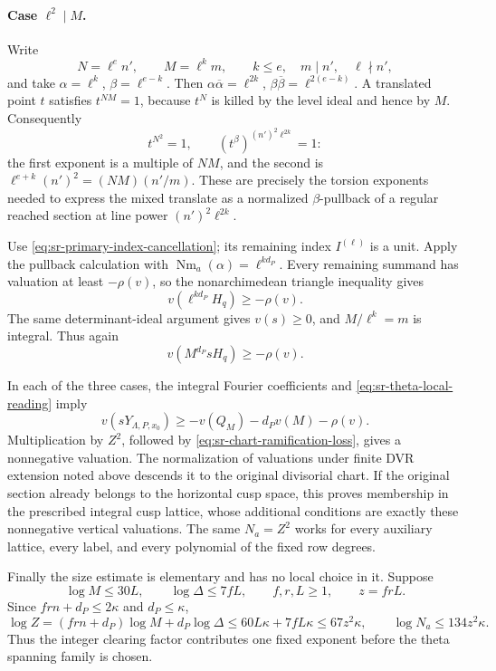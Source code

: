 \paragraph{Case \(\ell^2\mid M\).}
Write
\[
 N=\ell^e n',\qquad M=\ell^k m,\qquad
 k\le e,\quad m\mid n',\quad \ell\nmid n',
\]
and take \(\alpha=\ell^k\), \(\beta=\ell^{e-k}\).
Then
\(\alpha\overline\alpha=\ell^{2k}\),
\(\beta\overline\beta=\ell^{2(e-k)}\).
A translated point \(t\) satisfies \(t^{NM}=1\), because
\(t^N\) is killed by the level ideal and hence by \(M\).
Consequently
\[
 t^{N^2}=1,\qquad
 (t^\beta)^{(n')^2\ell^{2k}}=1:
\]
the first exponent is a multiple of \(NM\), and the second is
\(\ell^{e+k}(n')^2=(NM)(n'/m)\).
These are precisely the torsion exponents needed to express the
mixed translate as a normalized \(\beta\)-pullback of a regular
reached section at line power \((n')^2\ell^{2k}\).

Use \eqref{eq:sr-primary-index-cancellation}; its remaining index
\(I^{(\ell)}\) is a unit.
Apply the pullback calculation with
\(\operatorname{Nm}_a(\alpha)=\ell^{kd_P}\).
Every remaining summand has valuation at least \(-\rho(v)\),
so the nonarchimedean triangle inequality gives
\[
                   v(\ell^{kd_P}H_q)\ge-\rho(v).
\]
The same determinant-ideal argument gives \(v(s)\ge0\), and
\(M/\ell^k=m\) is integral.  Thus again
\[
                         v(M^{d_P}sH_q)\ge-\rho(v).
\]

In each of the three cases, the integral Fourier coefficients and
\eqref{eq:sr-theta-local-reading} imply
\[
 v(sY_{\Lambda,P,x_0})
      \ge-v(Q_M)-d_Pv(M)-\rho(v).
\]
Multiplication by \(Z^2\), followed by
\eqref{eq:sr-chart-ramification-loss}, gives a nonnegative valuation.
The normalization of valuations under finite DVR extension noted
above descends it to the original divisorial chart.
If the original section already belongs to the horizontal cusp
space, this proves membership in the prescribed integral cusp
lattice, whose additional conditions are exactly these
nonnegative vertical valuations.
The same \(N_a=Z^2\) works for every auxiliary lattice, every label,
and every polynomial of the fixed row degrees.

Finally the size estimate is elementary and has no local choice
in it.  Suppose
\[
 \log M\le30L,\qquad
 \log\Delta\le7fL,\qquad f,r,L\ge1,\qquad z=frL .
\]
Since \(frn+d_P\le2\kappa\) and \(d_P\le\kappa\),
\[
 \log Z
   =(frn+d_P)\log M+d_P\log\Delta
   \le60L\kappa+7fL\kappa
   \le67z^2\kappa ,
 \qquad
 \log N_a\le134z^2\kappa .
\]
Thus the integer clearing factor contributes one fixed exponent
before the theta spanning family is chosen.

